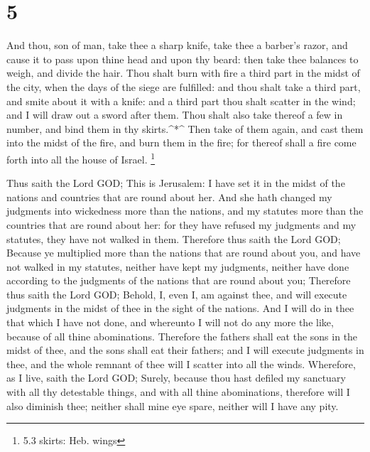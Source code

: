 \hypertarget{section-4}{%
\section{5}\label{section-4}}

 And thou, son of man, take thee a sharp knife, take thee a
barber's razor, and cause it to pass upon thine head and upon thy beard:
then take thee balances to weigh, and divide the hair.  Thou
shalt burn with fire a third part in the midst of the city, when the
days of the siege are fulfilled: and thou shalt take a third part, and
smite about it with a knife: and a third part thou shalt scatter in the
wind; and I will draw out a sword after them.  Thou shalt
also take thereof a few in number, and bind them in thy skirts.\^{}*\^{}
 Then take of them again, and cast them into the midst of
the fire, and burn them in the fire; for thereof shall a fire come forth
into all the house of Israel. \footnote{5.3 skirts: Heb. wings}

 Thus saith the Lord GOD; This is Jerusalem: I have set it
in the midst of the nations and countries that are round about her.
 And she hath changed my judgments into wickedness more than
the nations, and my statutes more than the countries that are round
about her: for they have refused my judgments and my statutes, they have
not walked in them.  Therefore thus saith the Lord GOD;
Because ye multiplied more than the nations that are round about you,
and have not walked in my statutes, neither have kept my judgments,
neither have done according to the judgments of the nations that are
round about you;  Therefore thus saith the Lord GOD; Behold,
I, even I, am against thee, and will execute judgments in the midst of
thee in the sight of the nations.  And I will do in thee
that which I have not done, and whereunto I will not do any more the
like, because of all thine abominations.  Therefore the
fathers shall eat the sons in the midst of thee, and the sons shall eat
their fathers; and I will execute judgments in thee, and the whole
remnant of thee will I scatter into all the winds. 
Wherefore, as I live, saith the Lord GOD; Surely, because thou hast
defiled my sanctuary with all thy detestable things, and with all thine
abominations, therefore will I also diminish thee; neither shall mine
eye spare, neither will I have any pity.


